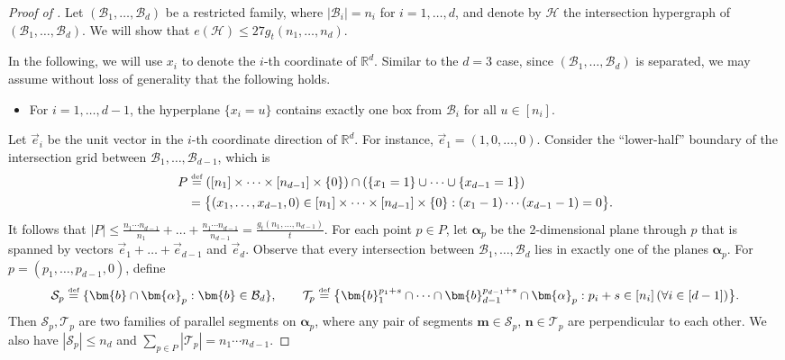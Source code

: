 \documentclass[11pt]{article}
\theoremstyle{definition}
\newcommand*{\eqdef}{\stackrel{\mbox{\normalfont\tiny def}}{=}} %
\newcommand*{\R}{\mathbb{R}}                                    %
\newcommand*{\cH}{\mathcal{H}}
\newcommand*{\cB}{\mathcal{B}}
\newcommand*{\cS}{\mathcal{S}}
\newcommand*{\cT}{\mathcal{T}}
\begin{document}
\begin{proof}[Proof of ]
    Let $(\cB_1, \dots, \cB_d)$ be a restricted family, where $|\cB_i| = n_i$ for $i = 1, \dots, d$, and denote by $\cH$ the intersection hypergraph of $(\cB_1, \dots, \cB_d)$. We will show that $e(\cH) \le 27g_t(n_1, \dots, n_d)$. 

    In the following, we will use $x_i$ to denote the $i$-th coordinate of $\mathbb{R}^d$. Similar to the $d = 3$ case, since $(\cB_1, \dots, \cB_d)$ is separated, we may assume without loss of generality that the following holds. 
    \vspace{-0.5em}
    \begin{itemize}
        \item For $i = 1, \dots, d - 1$, the hyperplane $\{x_i = u\}$ contains exactly one box from $\cB_i$ for all $u \in [n_i]$. 
    \end{itemize}
    \vspace{-0.5em}

    Let $\vec{e}_i$ be the unit vector in the $i$-th coordinate direction of $\R^d$. For instance, $\vec{e}_1 = (1, 0, \dots, 0)$. Consider the ``lower-half'' boundary of the intersection grid between $\cB_1, \dots, \cB_{d-1}$, which is
    \begin{align*}
        P &\eqdef ([n_1] \times \dots \times [n_{d-1}] \times \{0\}) \cap (\{x_1 = 1\} \cup \dots \cup \{x_{d-1} = 1\}) \\
        &= \bigl\{ (x_1, \dots, x_{d-1}, 0) \in [n_1] \times \dots \times [n_{d-1}] \times \{0\} : (x_1-1) \cdots (x_{d-1}-1) = 0 \bigr\}. 
    \end{align*}
    It follows that $|P| \le \frac{n_1 \cdots n_{d-1}}{n_1} + \dots + \frac{n_1 \cdots n_{d-1}}{n_{d-1}} = \frac{g_t(n_1, \dots, n_{d-1})}{t}$. For each point $p \in P$, let $\bm{\alpha}_p$ be the 2-dimensional plane through $p$ that is spanned by vectors $\vec{e}_1 + \dots + \vec{e}_{d-1}$ and $\vec{e}_d$. Observe that every intersection between $\cB_1, \dots, \cB_d$ lies in exactly one of the planes $\bm{\alpha}_p$. For $p = (p_1, \dots, p_{d-1}, 0)$, define
    \[
    \cS_p \eqdef \{\bm{b} \cap \bm{\alpha}_p : \bm{b} \in \cB_d\}, \qquad \cT_p \eqdef \bigl\{ \bm{b}_1^{p_1+s} \cap \dots \cap \bm{b}_{d-1}^{p_{d-1}+s} \cap \bm{\alpha}_p : p_i + s \in [n_i] \, (\forall i \in [d-1]) \bigr\}. 
    \]
    Then $\cS_p, \cT_p$ are two families of parallel segments on $\bm{\alpha}_p$, where any pair of segments $\bm{m} \in \cS_p, \, \bm{n} \in \cT_p$ are perpendicular to each other. We also have $|\cS_p| \le n_d$ and $\sum_{p \in P} |\cT_p| = n_1 \cdots n_{d-1}$. 


\end{proof}
\end{document}
